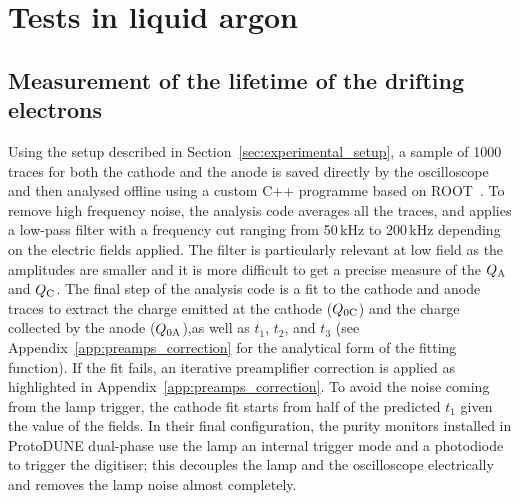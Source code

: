 \documentclass[a4paper,11pt]{article}
\newcommand{\QC}{\ensuremath{Q_{\rm C}}\xspace}
\newcommand{\QA}{\ensuremath{Q_{\rm A}}\xspace}
\begin{document}
\section{Tests in liquid argon}
\label{sec:tests_liquid}

\subsection{Measurement of the lifetime of the drifting electrons}
Using the setup described in Section~\ref{sec:experimental_setup}, a sample of 1000 traces for both the cathode and the anode is saved directly by the oscilloscope and then analysed offline using a custom C++ programme based on ROOT~\cite{Brun:1997pa}. 
To remove high frequency noise, the analysis code averages all the traces, and applies a low-pass filter with a frequency cut ranging from 50\,kHz to 200\,kHz depending on the electric fields applied. 
The filter is particularly relevant at low field as the amplitudes are smaller and it is more difficult to get a precise measure of the \QA and \QC.
The final step of the analysis code is a fit to the cathode and anode traces to extract the charge emitted at the cathode ($Q_{0\rm C}$) and the charge collected by the anode ($Q_{0\rm A}$),as well as $t_1$, $t_2$, and $t_3$ (see Appendix~\ref{app:preamps_correction} for the analytical form of the fitting function). If the fit fails, an iterative preamplifier correction is applied as highlighted in Appendix~\ref{app:preamps_correction}.
To avoid the noise coming from the lamp trigger, the cathode fit starts from half of the predicted $t_1$ given the value of the fields.
In their final configuration, the purity monitors installed in ProtoDUNE dual-phase use the lamp an internal trigger mode and a photodiode to trigger the digitiser; this decouples the lamp and the oscilloscope electrically and removes the lamp noise almost completely.

\end{document}
